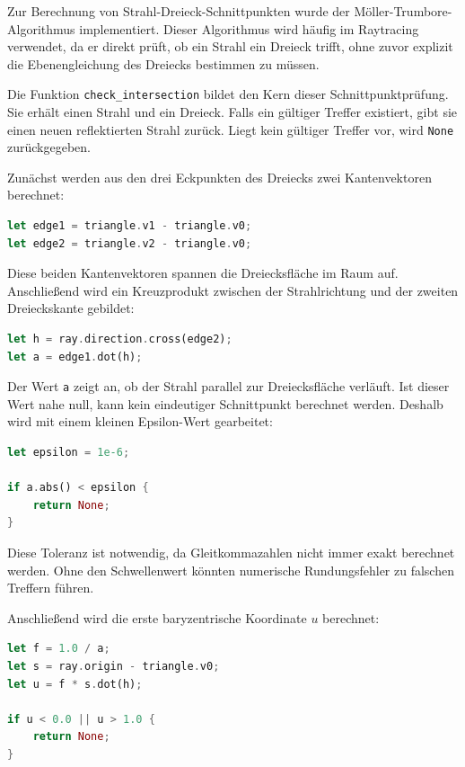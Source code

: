 Zur Berechnung von Strahl-Dreieck-Schnittpunkten wurde der
Möller-Trumbore-Algorithmus \parencite{moeller1997} implementiert. Dieser Algorithmus wird häufig im
Raytracing verwendet, da er direkt prüft, ob ein Strahl ein Dreieck trifft, ohne
zuvor explizit die Ebenengleichung des Dreiecks bestimmen zu müssen.

Die Funktion \texttt{check\_intersection} bildet den Kern dieser
Schnittpunktprüfung. Sie erhält einen Strahl und ein Dreieck. Falls ein gültiger
Treffer existiert, gibt sie einen neuen reflektierten Strahl zurück. Liegt kein
gültiger Treffer vor, wird \texttt{None} zurückgegeben.

Zunächst werden aus den drei Eckpunkten des Dreiecks zwei Kantenvektoren
berechnet:

\begin{lstlisting}[language=Rust]
let edge1 = triangle.v1 - triangle.v0;
let edge2 = triangle.v2 - triangle.v0;
\end{lstlisting}

Diese beiden Kantenvektoren spannen die Dreiecksfläche im Raum auf.
Anschließend wird ein Kreuzprodukt zwischen der Strahlrichtung und der zweiten
Dreieckskante gebildet:

\begin{lstlisting}[language=Rust]
let h = ray.direction.cross(edge2);
let a = edge1.dot(h);
\end{lstlisting}

Der Wert \texttt{a} zeigt an, ob der Strahl parallel zur Dreiecksfläche
verläuft. Ist dieser Wert nahe null, kann kein eindeutiger Schnittpunkt
berechnet werden. Deshalb wird mit einem kleinen Epsilon-Wert gearbeitet:

\begin{lstlisting}[language=Rust]
let epsilon = 1e-6;

if a.abs() < epsilon {
    return None;
}
\end{lstlisting}

Diese Toleranz ist notwendig, da Gleitkommazahlen nicht immer exakt berechnet
werden. Ohne den Schwellenwert könnten numerische Rundungsfehler zu falschen
Treffern führen.

Anschließend wird die erste baryzentrische Koordinate \(u\) berechnet:

\begin{lstlisting}[language=Rust]
let f = 1.0 / a;
let s = ray.origin - triangle.v0;
let u = f * s.dot(h);

if u < 0.0 || u > 1.0 {
    return None;
}
\end{lstlisting}

